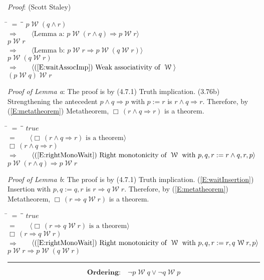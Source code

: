 \documentclass[12pt, fleqn, leqno]{article}
\newcommand{\lgap}{2pt}                             %
\newcommand{\mymathindent}{24pt}                    %
\newcommand{\impl}{\ensuremath{\Rightarrow}}        %
\newcommand{\Wait}{\;\mathcal{W}\;}
\newcommand{\Always}{\Box\,}
\newcommand{\myqed}{\rule[-.23ex]{1.2ex}{2.0ex}}
\newcommand{\myqedtab}{\hspace{384pt}}              %
\newcommand{\Gll} {\langle}                         %
\newcommand{\Ggg} {\rangle}                         %
\newcommand{\Hint}[1]     {\ \ \ $\Gll              \mbox{#1} \Ggg$ }   %
\begin{document}
\emph{Proof}: (Scott Staley)
\begin{tabbing}
\hspace{\mymathindent} \= $= \;$ \= \myqedtab \= \kill
  \> \>   $p\Wait (q\land r)$\\[\lgap]
  \> $\impl$  \>  \Hint{Lemma a: $p\Wait (r\land q)\impl p\Wait r$}\\[\lgap]
  \> \>   $p \Wait r$\\[\lgap]
  \> $\impl$  \>  \Hint{Lemma b: $p\Wait r\impl p\Wait (q\Wait r)$}\\[\lgap]
  \> \>   $p \Wait (q \Wait r)$\\[\lgap]
  \> $\impl$ \> \Hint{(\ref{E:waitAssocImp}) Weak associativity of $\Wait$}\\[\lgap]
  \> \>   $(p \Wait q) \Wait r$
\end{tabbing}
\emph{Proof of Lemma a}: The proof is by (4.7.1) Truth implication.
(3.76b) Strengthening the antecedent $p\land q\impl p$ with $p := r$ is $r\land q\impl r$.
Therefore, by (\ref{E:metatheorem}) Metatheorem, $\Always (r\land q\impl r)$ is a theorem.
\begin{tabbing}
\hspace{\mymathindent} \= $= \;$ \= \myqedtab \= \kill
  \> \>   $true$\\[\lgap]
  \> $=$  \>  \Hint{$\Always (r\land q\impl r)$ is a theorem}\\[\lgap]
  \> \>   $\Always (r\land q\impl r)$\\[\lgap]
  \> $\impl$ \> \Hint{(\ref{E:rightMonoWait}) Right monotonicity of $\Wait$ with $p,q,r:=r\land q,r,p$} \\[\lgap]
  \> \>   $p\Wait(r\land q)\impl p\Wait r$
\end{tabbing}
\emph{Proof of Lemma b}: The proof is by (4.7.1) Truth implication.
(\ref{E:waitInsertion}) Insertion with $p,q := q,r$ is $r\impl q\Wait r$.
Therefore, by (\ref{E:metatheorem}) Metatheorem, $\Always (r\impl q\Wait r)$ is a theorem.
\begin{tabbing}
\hspace{\mymathindent} \= $= \;$ \= \myqedtab \= \kill
  \> \>   $true$\\[\lgap]
  \> $=$  \>  \Hint{$\Always (r\impl q\Wait r)$ is a theorem}\\[\lgap]
  \> \>   $\Always (r\impl q\Wait r)$\\[\lgap]
  \> $\impl$ \> \Hint{(\ref{E:rightMonoWait}) Right monotonicity of $\Wait$ with $p,q,r:=r,q\Wait r,p$} \\[\lgap]
  \> \>   $p\Wait r\impl p\Wait (q\Wait r)$ \quad \myqed
\end{tabbing}
\begin{equation}\label{E:waitOrdering}
\textbf{Ordering:}\quad \neg p \Wait q \lor \neg q \Wait p
\end{equation}
\end{document}
